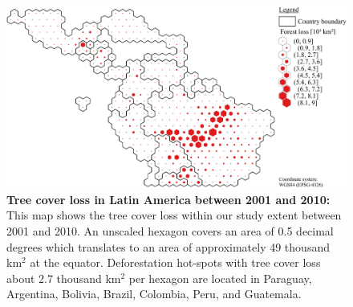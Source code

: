 			\begin{figure}[ht]
				\centering
				\includegraphics[scale=.9]{img/americas_loss_frameless}
				\caption[Tree cover loss in Latin America between 2001 and 2010]{\textbf{Tree cover loss in Latin America between 2001 and 2010:} This map shows the tree cover loss within our study extent between 2001 and 2010. An unscaled hexagon covers an area of 0.5 decimal degrees which translates to an area of approximately 49 thousand km$^2$ at the equator. Deforestation hot-spots with tree cover loss about 2.7 thousand km$^2$ per hexagon are located in Paraguay, Argentina, Bolivia, Brazil, Colombia, Peru, and Guatemala.}
				\label{fig:americas_loss}
			\end{figure}

